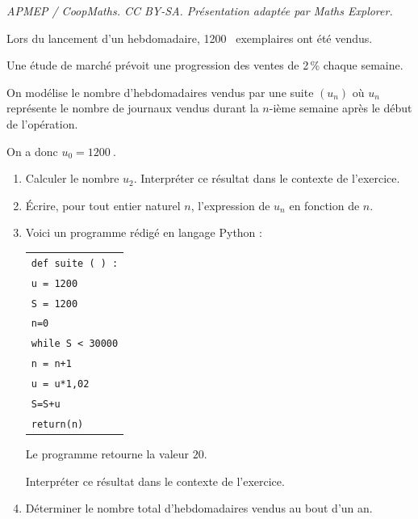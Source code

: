 \documentclass[10pt]{article}
\providecommand{\np}[2][]{{#2~#1}}
\begin{document}
\noindent\textit{APMEP / CoopMaths. CC BY-SA. Présentation adaptée par Maths Explorer.}\par\medskip
\medskip

Lors du lancement d'un hebdomadaire, \np{1200} exemplaires ont été vendus.

Une étude de marché prévoit une progression des ventes de 2\,\% chaque semaine.

On modélise le nombre d'hebdomadaires vendus par une suite $\left(u_n\right)$ où $u_n$ représente le nombre de journaux vendus durant la $n$-ième semaine après le début de l'opération.

On a donc $u_0 = \np{1200}$.

\medskip

\begin{enumerate}
\item Calculer le nombre $u_2$. Interpréter ce résultat dans le contexte de l'exercice. 
\item Écrire, pour tout entier naturel $n$, l'expression de $u_n$ en fonction de $n$.
\item Voici un programme rédigé en langage Python :

\begin{center}
\begin{tabularx}{0.45\linewidth}{|X|}\hline
\texttt{def suite ( ) :}\\
\quad \texttt{u = 1200} \\
\quad \texttt{S = 1200}\\
\quad \texttt{n=0}\\
\quad \texttt{while S < 30000}\\
\qquad \texttt{n = n+1}\\
\qquad  \texttt{u = u*1,02}\\
\qquad  \texttt{S=S+u}\\
\quad \texttt{return(n)}\\ \hline
\end{tabularx}
\end{center}

Le programme retourne la valeur $20$.

Interpréter ce résultat dans le contexte de l'exercice.
\item Déterminer le nombre total d'hebdomadaires vendus au bout d'un an.
\end{enumerate}

\bigskip
\end{document}
